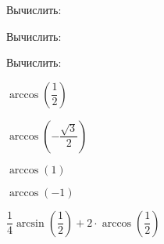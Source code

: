 \begin{listofex}
	\item Вычислить:
	\begin{enumcols}[itemcolumns=3]
		\item {}
		\item {}
		\item {}
		\item {}
		\item {}
		\item {}
	\end{enumcols}
	\item Вычислить:
	\begin{enumcols}[itemcolumns=2]
		\item {}
		\item {}
		\item {}
		\item {}
	\end{enumcols}
	\item {}
	\item {}
	\item {}
	\item {}
	\item Вычислить:
	\begin{enumcols}[itemcolumns=2]
		\item \( \arccos\left( \dfrac{1}{2} \right) \)
		\item \( \arccos\left( -\dfrac{\sqrt{3}}{2} \right) \)
		\item \( \arccos(1) \)
		\item \( \arccos(-1) \)
		\item \( \dfrac{1}{4}\arcsin\left( \dfrac{1}{2} \right)+2\cdot\arccos\left( \dfrac{1}{2} \right) \)
	\end{enumcols}
	\item {}
\end{listofex}